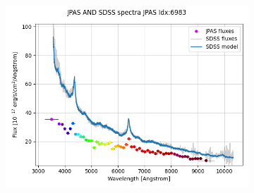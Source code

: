 \documentclass{beamer}
\begin{document}
\begin{frame}
\begin{columns}
\begin{figure}
\begin{subfigure}{0.75\textwidth}
                \includegraphics[width=1.0\textwidth]{../../figs/spec/jpas_sdss_6983.png}
            \end{subfigure}
        \end{figure}
        \end{columns}
\end{frame}
\end{document}
